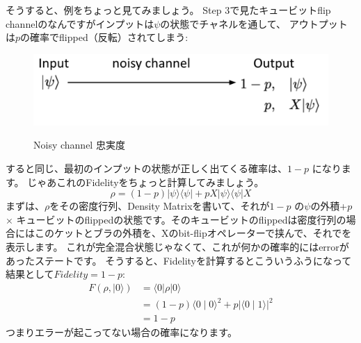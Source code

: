 そうすると、例をちょっと見てみましょう。
Step 3で見たキュービットflip channelのなんですがインプットは$\psi$の状態でチャネルを通して、
アウトプットは$p$の確率でflipped（反転）されてしまう:
\begin{figure}[H]
    \centering
    \includegraphics[width=1.0\textwidth]{lesson3/noisy_channel_ex.pdf}
    \label{fig: 1}
    \begin{center}
        \caption{Noisy channel 忠実度}
    \end{center}
\end{figure}

すると同じ、最初のインプットの状態が正しく出てくる確率は、$1-p$ になります。
じゃあこれのFidelityをちょっと計算してみましょう。
\begin{equation}
\rho=(1-p)|\psi\rangle\langle\psi|+p X| \psi\rangle\langle\psi| X
\end{equation}
まずは、$\rho$をその密度行列、Density Matrixを書いて、それが$1-p$ の$\psi$の外積+$p$ × キュービットのflippedの状態です。そのキュービットのflippedは密度行列の場合にはこのケットとブラの外積を、Xのbit-flipオペレーターで挟んで、それでを表示します。
これが完全混合状態じゃなくて、これが何かの確率的にはerrorがあったステートです。
そうすると、Fidelityを計算するとこういうふうになって結果として$Fidelity=1-p$:
\begin{equation}
\begin{aligned}
F(\rho,|0\rangle) &=\langle 0|\rho| 0\rangle \\
&=(1-p)\langle 0 \mid 0\rangle^{2}+p|\langle 0 \mid 1\rangle|^{2} \\
&=1-p
\end{aligned}
\end{equation}
つまりエラーが起こってない場合の確率になります。

